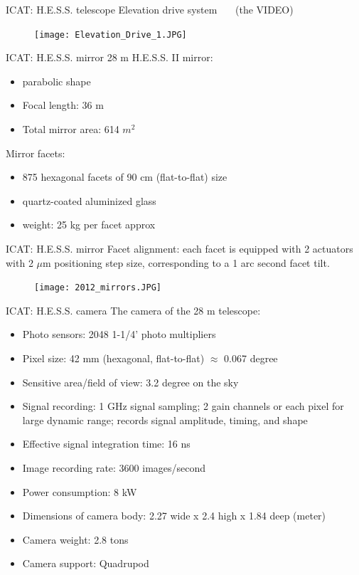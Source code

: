 \documentclass{beamer}
\begin{document}
\begin{frame}{ICAT: H.E.S.S. telescope}
	Elevation drive system
	\, \, \, (the VIDEO)
	\begin{figure}[h]
		\texttt{[image: Elevation\_Drive\_1.JPG]}
	\end{figure}
\end{frame}

\begin{frame}{ICAT: H.E.S.S. mirror}
	28 m H.E.S.S. II mirror:
	\begin{itemize}
		\item parabolic shape
		\item Focal length: 36 m
		\item Total mirror area: 614 $m^2$
	\end{itemize}
	\hfill \break
	Mirror facets:
	\begin{itemize}
		\item 875 hexagonal facets of 90 cm (flat-to-flat) size
		\item quartz-coated aluminized glass
		\item weight: 25 kg per facet approx
	\end{itemize}
\end{frame}

\begin{frame}{ICAT: H.E.S.S. mirror}
	Facet alignment: each facet is equipped with 2 actuators with 2 $\mu\text{m}$ positioning step size, corresponding to a 1 arc second facet tilt.
	\begin{figure}[h]
		\texttt{[image: 2012\_mirrors.JPG]}
	\end{figure}
\end{frame}


\begin{frame}{ICAT: H.E.S.S. camera}
	The camera of the 28 m telescope:
	\begin{itemize}
		\item Photo sensors: 2048 1-1/4’ photo multipliers
		\item Pixel size: 42 mm (hexagonal, flat-to-flat) $\approx$ 0.067 degree
		\item Sensitive area/field of view: 3.2 degree on the sky
		\item Signal recording: 1 GHz signal sampling; 2 gain channels or each pixel for large dynamic range; records signal amplitude, timing, and shape
		\item Effective signal integration time: 16 ns
		\item Image recording rate: 3600 images/second
		\item Power consumption: 8 kW
		\item Dimensions of camera body: 2.27 wide x 2.4 high x 1.84 deep (meter)
		\item Camera weight: 2.8 tons
		\item Camera support: Quadrupod
	\end{itemize}
\end{frame}
\end{document}
